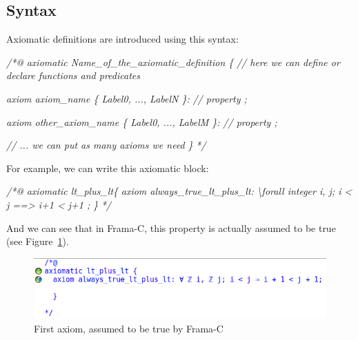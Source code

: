 \documentclass[12pt,francais,]{scrbook}
\newenvironment{Shaded}{}{}
\newcommand{\CommentTok}[1]{\textcolor[rgb]{0.38,0.63,0.69}{\textit{{#1}}}}
\begin{document}
\subsection{Syntax}\label{syntax-3}

Axiomatic definitions are introduced using this syntax:

\begin{footnotesize}\begin{Shaded}
\begin{Highlighting}[]
\CommentTok{/*@}
\CommentTok{  axiomatic Name_of_the_axiomatic_definition \{}
\CommentTok{    // here we can define or declare functions and predicates}

\CommentTok{    axiom axiom_name \{ Label0, ..., LabelN \}:}
\CommentTok{      // property ;}

\CommentTok{    axiom other_axiom_name \{ Label0, ..., LabelM \}:}
\CommentTok{      // property ;}

\CommentTok{    // ... we can put as many axioms we need}
\CommentTok{  \}}
\CommentTok{*/}
\end{Highlighting}
\end{Shaded}\end{footnotesize}

\clearpage
For example, we can write this axiomatic block:

\begin{footnotesize}\begin{Shaded}
\begin{Highlighting}[]
\CommentTok{/*@}
\CommentTok{  axiomatic lt_plus_lt\{}
\CommentTok{    axiom always_true_lt_plus_lt:}
\CommentTok{      \textbackslash{}forall integer i, j; i < j ==> i+1 < j+1 ;}
\CommentTok{  \}}
\CommentTok{*/}
\end{Highlighting}
\end{Shaded}\end{footnotesize}

And we can see that in Frama-C, this property is actually assumed to be
true (see Figure~\ref{fig:5-1-1-fst-axiom}).

\begin{figure}[htbp]
\centering
\includegraphics[scale=0.5]{5-1-1-premier-axiome.png}
\caption{First axiom, assumed to be true by Frama-C}
\label{fig:5-1-1-fst-axiom}
\end{figure}
\end{document}
